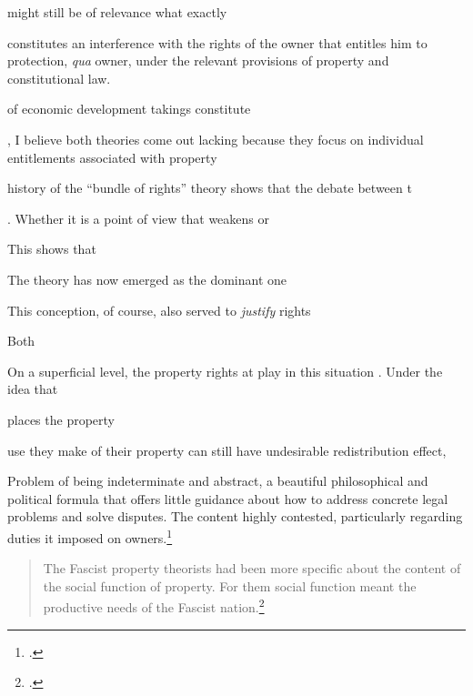 might still be of relevance what exactly

constitutes an interference with the rights of the owner that entitles him to protection, {\it qua} owner, under the relevant provisions of property and constitutional law. 

of economic development takings constitute 


, I believe both theories come out lacking because they focus on individual entitlements associated with property

 history of the ``bundle of rights'' theory shows that the debate between t


. Whether it is a point of view that weakens or 


This shows that 

The theory has now emerged as the dominant one


This conception, of course, also served to {\it justify}  rights 

Both 


On a superficial level, the property rights at play in this situation . Under the idea that 

 places the property 

 use they make of their property can still have undesirable redistribution effect, 



Problem of being indeterminate and abstract, a beautiful philosophical and political formula that offers little guidance about how to address concrete legal problems and solve disputes. The content highly contested, particularly regarding duties it imposed on owners.\footcite[908]{robilant13}

\begin{quote}
The Fascist property theorists had been more specific about the content of the social function of property. For them social function meant the productive needs of the Fascist nation.\footcite[909]{robilant13}
\end{quote}


